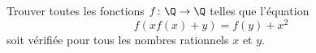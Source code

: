 Trouver toutes les fonctions $f \colon \Q \to \Q$ telles que l'équation
\[ f(xf(x)+y) = f(y) + x^2 \]
soit vérifiée pour tous les nombres rationnels $x$ et $y$.
